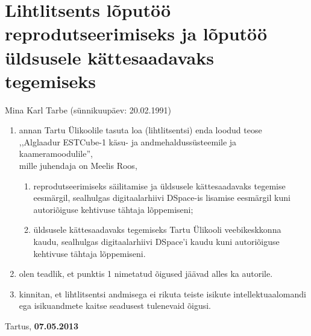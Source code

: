 \documentclass[12pt,a4paper]{article}
\begin{document}
\newpage
\section*{Lihtlitsents lõputöö reprodutseerimiseks ja lõputöö üldsusele
kättesaadavaks tegemiseks}

Mina Karl Tarbe (sünnikuupäev: 20.02.1991)
\begin{enumerate}
	\item
		annan Tartu Ülikoolile tasuta loa (lihtlitsentsi) enda loodud teose\\
		,,Alglaadur ESTCube-1 käsu- ja andmehaldussüsteemile ja
		kaameramoodulile'',\\
		mille juhendaja on Meelis Roos,
		\begin{enumerate}
			\item 
				reprodutseerimiseks säilitamise ja üldsusele kättesaadavaks
				tegemise eesmärgil, sealhulgas digitaalarhiivi DSpace-is
				lisamise eesmärgil kuni autoriõiguse kehtivuse tähtaja
				lõppemiseni;
			\item
				üldsusele kättesaadavaks tegemiseks Tartu Ülikooli
				veebikeskkonna kaudu, sealhulgas digitaalarhiivi DSpace'i kaudu
				kuni autoriõiguse kehtivuse tähtaja lõppemiseni.
		\end{enumerate}
	\item
		olen teadlik, et punktis 1 nimetatud õigused jäävad alles ka autorile.
	\item
		kinnitan, et lihtlitsentsi andmisega ei rikuta teiste isikute
		intellektuaalomandi ega isikuandmete kaitse seadusest tulenevaid õigusi.
\end{enumerate}

Tartus, \textbf{07.05.2013}
\end{document}
